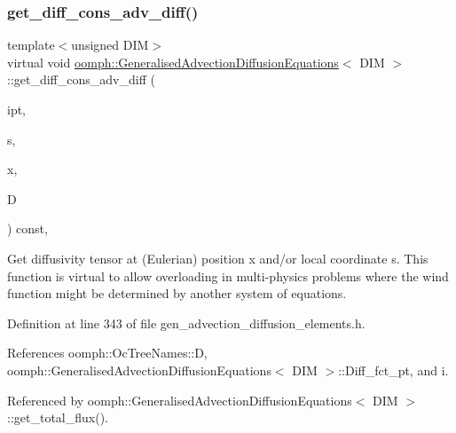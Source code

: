 \subsubsection{\texorpdfstring{get\+\_\+diff\+\_\+cons\+\_\+adv\+\_\+diff()}{get\_diff\_cons\_adv\_diff()}}
{\footnotesize\ttfamily template$<$unsigned D\+IM$>$ \\
virtual void \hyperlink{classoomph_1_1GeneralisedAdvectionDiffusionEquations}{oomph\+::\+Generalised\+Advection\+Diffusion\+Equations}$<$ D\+IM $>$\+::get\+\_\+diff\+\_\+cons\+\_\+adv\+\_\+diff (\begin{DoxyParamCaption}\item[{const unsigned \&}]{ipt,  }\item[{const \hyperlink{classoomph_1_1Vector}{Vector}$<$ double $>$ \&}]{s,  }\item[{const \hyperlink{classoomph_1_1Vector}{Vector}$<$ double $>$ \&}]{x,  }\item[{\hyperlink{classoomph_1_1DenseMatrix}{Dense\+Matrix}$<$ double $>$ \&}]{D }\end{DoxyParamCaption}) const\hspace{0.3cm}{\ttfamily [inline]}, {\ttfamily [virtual]}}



Get diffusivity tensor at (Eulerian) position x and/or local coordinate s. This function is virtual to allow overloading in multi-\/physics problems where the wind function might be determined by another system of equations. 



Definition at line 343 of file gen\+\_\+advection\+\_\+diffusion\+\_\+elements.\+h.



References oomph\+::\+Oc\+Tree\+Names\+::D, oomph\+::\+Generalised\+Advection\+Diffusion\+Equations$<$ D\+I\+M $>$\+::\+Diff\+\_\+fct\+\_\+pt, and i.



Referenced by oomph\+::\+Generalised\+Advection\+Diffusion\+Equations$<$ D\+I\+M $>$\+::get\+\_\+total\+\_\+flux().

\mbox{\label{classoomph_1_1GeneralisedAdvectionDiffusionEquations_a708e237798252ad6b207b14a627e7ec0}} 
